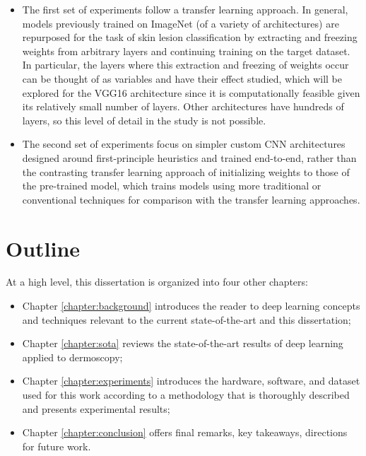 \begin{itemize}
    \item The first set of experiments follow a transfer learning approach. In general, models previously trained on ImageNet (of a variety of architectures) are repurposed for the task of skin lesion classification by extracting and freezing weights from arbitrary layers and continuing training on the target dataset. In particular, the layers where this extraction and freezing of weights occur can be thought of as variables and have their effect studied, which will be explored for the VGG16 architecture since it is computationally feasible given its relatively small number of layers. Other architectures have hundreds of layers, so this level of detail in the study is not possible.
    \item The second set of experiments focus on simpler custom \ac{CNN} architectures designed around first-principle heuristics and trained end-to-end, rather than the contrasting transfer learning approach of initializing weights to those of the pre-trained model, which trains models using more traditional or conventional techniques for comparison with the transfer learning approaches.
\end{itemize}

\section{Outline}

At a high level, this dissertation is organized into four other chapters:

\begin{itemize}
    \item Chapter \ref{chapter:background} introduces the reader to deep learning concepts and techniques relevant to the current state-of-the-art and this dissertation;
    \item Chapter \ref{chapter:sota} reviews the state-of-the-art results of deep learning applied to dermoscopy;
    \item Chapter \ref{chapter:experiments} introduces the hardware, software, and dataset used for this work according to a methodology that is thoroughly described and presents experimental results;
    \item Chapter \ref{chapter:conclusion} offers final remarks, key takeaways, directions for future work.
\end{itemize}
